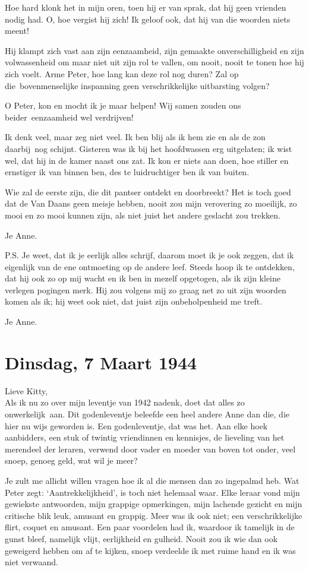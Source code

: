 \documentclass{book}
\begin{document}
Hoe hard klonk het in mijn oren, toen hij er van sprak, dat hij geen vrienden
nodig had. O, hoe vergist hij zich! Ik geloof ook, dat hij van die woorden niets
meent!

Hij klampt zich vast aan zijn eenzaamheid, zijn gemaakte onverschilligheid en
zijn volwassenheid om maar niet uit zijn rol te vallen, om nooit, nooit te tonen
hoe hij zich voelt. Arme Peter, hoe lang kan deze rol nog duren? Zal op
die~bovenmenselijke inspanning geen verschrikkelijke uitbarsting volgen?

O Peter, kon en mocht ik je maar helpen! Wij samen zouden ons beider~eenzaamheid
wel verdrijven!

Ik denk veel, maar zeg niet veel. Ik ben blij als ik hem zie en als de zon
daarbij~nog schijnt. Gisteren was ik bij het hoofdwassen erg uitgelaten; ik wist
wel, dat hij in de kamer naast ons zat. Ik kon er niets aan doen, hoe stiller en
ernstiger ik van binnen ben, des te luidruchtiger ben ik van buiten.

Wie zal de eerste zijn, die dit pantser ontdekt en doorbreekt? Het is toch goed
dat de Van Daans geen meisje hebben, nooit zou mijn verovering zo moeilijk, zo
mooi en zo mooi kunnen zijn, als niet juist het andere geslacht zou trekken.

Je Anne.

P.S. Je weet, dat ik je eerlijk alles schrijf, daarom moet ik je ook zeggen, dat
ik eigenlijk van de ene ontmoeting op de andere leef. Steeds hoop ik te
ontdekken, dat hij ook zo op mij wacht en ik ben in mezelf opgetogen, als ik
zijn kleine verlegen pogingen merk. Hij zou volgens mij zo graag net zo uit zijn
woorden komen als ik; hij weet ook niet, dat juist zijn onbeholpenheid me treft.

Je Anne.

\section*{Dinsdag, 7 Maart 1944}

Lieve Kitty,\\
Als ik nu zo over mijn leventje van 1942 nadenk, doet dat alles
zo onwerkelijk~aan. Dit godenleventje beleefde een heel andere Anne dan die, die
hier nu wijs geworden is. Een godenleventje, dat was het. Aan elke hoek
aanbidders, een stuk of twintig vriendinnen en kennisjes, de lieveling van het
merendeel der leraren, verwend door vader en moeder van boven tot onder, veel
snoep, genoeg geld, wat wil je meer?

Je zult me allicht willen vragen hoe ik al die mensen dan zo ingepalmd heb. Wat
Peter zegt: `Aantrekkelijkheid', is toch niet helemaal waar.  Elke leraar vond
mijn gewiekste antwoorden, mijn grappige opmerkingen, mijn lachende gezicht en
mijn critische blik leuk, amusant en grappig.  Meer was ik ook niet; een
verschrikkelijke flirt, coquet en amusant. Een paar voordelen had ik, waardoor
ik tamelijk in de gunst bleef, namelijk vlijt, eerlijkheid en gulheid. Nooit zou
ik wie dan ook geweigerd hebben om af te kijken, snoep verdeelde ik met ruime
hand en ik was niet verwaand.
\end{document}
